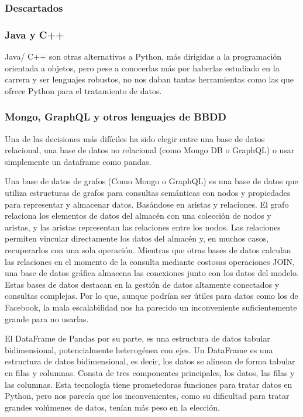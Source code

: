  	\subsubsection{Descartados}
 		\subsubsection*{Java y C++}
 			Java/ C++ son otras alternativas a Python, más dirigidas a la programación orientada a objetos, pero pese a conocerlas más por haberlas estudiado en la carrera y ser lenguajes robustos, no nos daban tantas herramientas como las que ofrece Python para el tratamiento de datos.
 		
 		\subsubsection*{Mongo, GraphQL y otros lenguajes de BBDD}
 			Una de las decisiones más difíciles ha sido elegir entre una base de datos relacional, una base de datos no relacional (como Mongo DB o GraphQL) o usar simplemente un dataframe como pandas.
 		  
 			Una base de datos de grafos (Como Mongo o GraphQL) es una base de datos que utiliza estructuras de grafos para consultas semánticas con nodos y propiedades para representar y almacenar datos. Basándose en aristas y relaciones. El grafo relaciona los elementos de datos del almacén con una colección de nodos y aristas, y las aristas representan las relaciones entre los nodos. Las relaciones permiten vincular directamente los datos del almacén y, en muchos casos, recuperarlos con una sola operación. Mientras que otras bases de datos calculan las relaciones en el momento de la consulta mediante costosas operaciones JOIN, una base de datos gráfica almacena las conexiones junto con los datos del modelo.
 			Estas bases de datos destacan en la gestión de datos altamente conectados y consultas complejas. Por lo que, aunque podrían ser útiles para datos como los de Facebook, la mala escalabilidad nos ha parecido un inconveniente suficientemente grande para no usarlas.
 		
 			El DataFrame de Pandas por su parte, es una estructura de datos tabular bidimensional, potencialmente heterogénea con ejes. Un DataFrame es una estructura de datos bidimensional, es decir, los datos se alinean de forma tabular en filas y columnas. Consta de tres componentes principales, los datos, las filas y las columnas. Esta tecnología tiene prometedoras funciones para tratar datos en Python, pero nos parecía que los inconvenientes, como su dificultad para tratar grandes volúmenes de datos, tenían más peso en la elección.
 		
